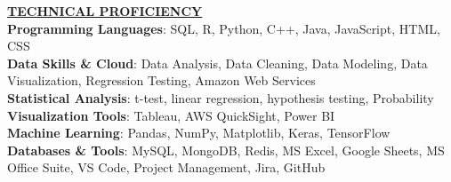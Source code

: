 \documentclass{article}
\begin{document}
\noindent \textbf{\underline{TECHNICAL PROFICIENCY}} \\
\textbf{Programming Languages}{: \small SQL, R, Python, C++, Java, JavaScript, HTML, CSS} \\
\textbf{Data Skills \& Cloud}{: \small Data Analysis, Data Cleaning, Data Modeling, Data Visualization, Regression Testing, Amazon Web Services} \\
\textbf{Statistical Analysis}{: \small t-test, linear regression, hypothesis testing, Probability} \\
\textbf{Visualization Tools}{: \small Tableau, AWS QuickSight, Power BI} \\
\textbf{Machine Learning}{: \small Pandas, NumPy, Matplotlib, Keras, TensorFlow} \\
\textbf{Databases \& Tools}{: \small MySQL, MongoDB, Redis, MS Excel, Google Sheets, MS Office Suite, VS Code, Project Management, Jira, GitHub} \\


\end{document}
